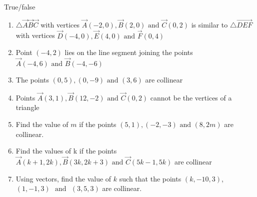 True/false
\begin{enumerate}[label=\thesection.\arabic*,ref=\thesection.\theenumi,resume*]
	\item $\triangle\vec{A}\vec{B}\vec{C}$ with vertices $\vec{A}(-2,0), \vec{B}(2,0) \text{ and }\vec{C}(0,2)$ is similar to $\triangle \vec{DEF}$  with vertices $\vec {D}(-4,0),\vec{E}(4,0)  \text{ and } \vec{F}(0,4)$  
	\item Point $ (-4,2)$ lies on the line segment joining the points $ \vec{A}(-4,6) \text{ and } \vec{B}(-4,-6)$
 \item The points $(0,5),(0,-9)\text{ and }(3,6)$ are collinear
\item Points $\vec{A}(3,1), \vec{B}(12,-2) \text{ and } \vec {C}(0,2)$ cannot be the vertices of a triangle
\item Find the value of $m$ if the points $(5,1),(-2,-3) \text{ and }(8,2m)$ are collinear.
\item Find the values of k if the points $\vec{A}(k+1,2k),\vec{B}(3k,2k+3)\text{ and }\vec{C}(5k-1,5k)$ are collinear
\item Using vectors, find the value of $k$ such that the points $(k,-10,3)$, $(1,-1,3)$ $\text{ and }$ $(3,5,3)$ are collinear.
\end{enumerate}
